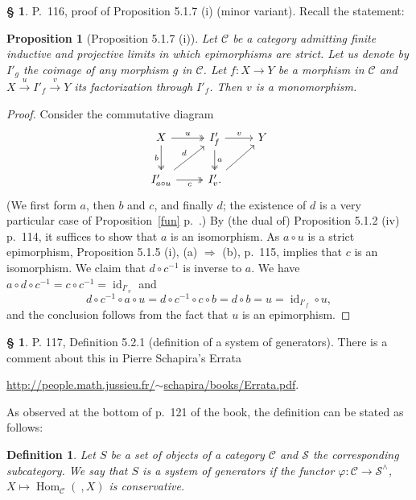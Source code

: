 \documentclass[12pt]{article}%
\newtheorem{prop}[thm]{Proposition}
\newtheorem{df}[thm]{Definition}%
\theoremstyle{remark}
\theoremstyle{definition}
\newtheorem{s}[thm]{\S}%
\newcommand{\cc}{\mathcal}
\newcommand{\C}{\mathcal C}
\newcommand{\pp}{\varphi}
\newcommand{\then}{\Rightarrow}
\newcommand{\xr}{\xrightarrow}
\DeclareMathOperator{\id}{id}
\DeclareMathOperator{\Hom}{Hom}%
\begin{document}
\begin{s} 
P.~116, proof of Proposition 5.1.7 (i) (minor variant). Recall the statement: 

\begin{prop}[Proposition 5.1.7 (i)]
Let $\C$ be a category admitting finite inductive and projective limits in which epimorphisms are strict. Let us denote by $I'_g$ the coimage of any morphism $g$ in $\C$. Let $f:X\to Y$ be a morphism in $\C$ and $X\xr u I'_f\xr v Y$ its factorization through $I'_f$. Then $v$ is a monomorphism. 
\end{prop}

\begin{proof}
Consider the commutative diagram
$$
\begin{tikzcd}
X\ar[two heads]{d}[swap]{b}\ar[two heads]{r}{u}&I'_f\ar[two heads]{d}{a}\ar{r}{v}&Y\\
I'_{a\circ u}\ar{ur}{d}\ar[two heads]{r}[swap]{c}&I'_v.\ar{ru}
\end{tikzcd}
$$ 
(We first form $a$, then $b$ and $c$, and finally $d$; the existence of $d$ is a very particular case of Proposition~\ref{fun} p.~\pageref{fun}.) By (the dual of) Proposition 5.1.2 (iv) p.~114, it suffices to show that $a$ is an isomorphism. As $a\circ u$ is a strict epimorphism, Proposition 5.1.5 (i), (a) $\then$ (b), p.~115, implies that $c$ is an isomorphism. We claim that $d\circ c^{-1}$ is inverse to $a$. We have $a\circ d\circ c^{-1}=c\circ c^{-1}=\id_{I'_v}$ and 
$$
d\circ c^{-1}\circ a\circ u=d\circ c^{-1}\circ c\circ b=d\circ b=u=\id_{I'_f}\circ u,
$$ 
and the conclusion follows from the fact that $u$ is an epimorphism.
\end{proof}
\end{s}

%

\begin{s}
P. 117, Definition 5.2.1 (definition of a system of generators). There is a comment about this in Pierre Schapira's Errata 

\href{http://people.math.jussieu.fr/~schapira/books/Errata.pdf}{http://people.math.jussieu.fr/$\sim$schapira/books/Errata.pdf}.

As observed at the bottom of p.~121 of the book, the definition can be stated as follows:

\begin{df}
Let $S$ be a set of objects of a category $\C$ and $\cc S$ the corresponding subcategory. We say that $S$ is a {\em system of generators}   if the functor $\pp:\C\to\cc S^\wedge$, $X\mapsto\Hom_\C(\ ,X)$ is conservative.
\end{df}
\end{s}
\end{document}
